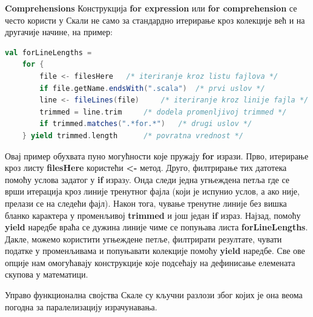 \documentclass[12pt,oneside]{memoir}
\begin{document}
\begin{description}
\item \textbf{Comprehensions}
Конструкција \textbf{for expression} или \textbf{for comprehension} се често користи у Скали не само за стандардно итерирање кроз колекције већ и на другачије начине, на пример:
\begin{lstlisting}[language=Scala]
val forLineLengths =
	for {
		file <- filesHere 	/* iteriranje kroz listu fajlova */
		if file.getName.endsWith(".scala") 	/* prvi uslov */
		line <- fileLines(file) 	/* iteriranje kroz linije fajla */
		trimmed = line.trim 	/* dodela promenljivoj trimmed */
		if trimmed.matches(".*for.*") 	/* drugi uslov */
	} yield trimmed.length 		/* povratna vrednost */
\end{lstlisting}
Овај пример обухвата пуно могућности које пружају \textbf{for} изрази. Прво, итерирање кроз листу \textbf{filesHere} користећи \textbf{<-} метод. Друго, филтрирање тих датотека помоћу услова задатог у \textbf{if} изразy. Онда следи једна угњеждена петља где се врши итерација кроз линије тренутног фајла (који је испунио услов, а ако није, прелази се на следећи фајл). Након тога, чување тренутне линије без вишка бланко карактера у променљивој \textbf{trimmed} и још један \textbf{if} израз. Најзад, помоћу \textbf{yield} наредбе враћа се дужина линије чиме се попуњава листа \textbf{forLineLengths}. Дакле, можемо користити угњеждене петље, филтрирати резултате, чувати податке у променљивама и попуњавати колекције помоћу \textbf{yield} наредбе. Све ове опције нам омогућавају конструкције које подсећају на дефинисање елемената скупова у математици.
\end{description}

\par Управо функционална својства Скале су кључни разлози због којих је она веома погодна за паралелизацију израчунавања. 

\end{document}
